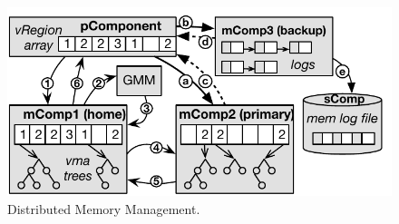 {
\begin{figure}[t]
\begin{center}
\centerline{\includegraphics[width=\textwidth]{lego/Figures/dist-vma.pdf}}
\caption[Distributed Memory Management.]{Distributed Memory Management.}
\label{fig-dist-vma}
\end{center}
\end{figure}
}
